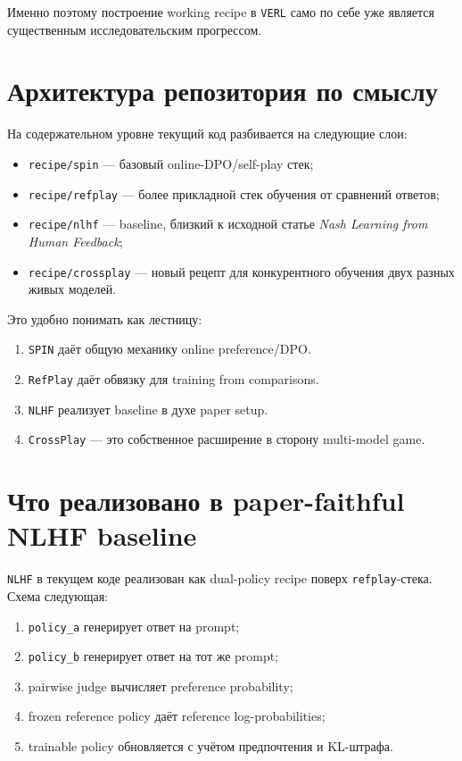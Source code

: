 \documentclass[11pt,a4paper]{article}
\begin{document}
Именно поэтому построение working recipe в \texttt{VERL} само по себе уже является существенным исследовательским прогрессом.

\section{Архитектура репозитория по смыслу}

На содержательном уровне текущий код разбивается на следующие слои:
\begin{itemize}
  \item \texttt{recipe/spin} --- базовый online-DPO/self-play стек;
  \item \texttt{recipe/refplay} --- более прикладной стек обучения от сравнений ответов;
  \item \texttt{recipe/nlhf} --- baseline, близкий к исходной статье \textit{Nash Learning from Human Feedback};
  \item \texttt{recipe/crossplay} --- новый рецепт для конкурентного обучения двух разных живых моделей.
\end{itemize}

Это удобно понимать как лестницу:
\begin{enumerate}[label=\arabic*.]
  \item \texttt{SPIN} даёт общую механику online preference/DPO.
  \item \texttt{RefPlay} даёт обвязку для training from comparisons.
  \item \texttt{NLHF} реализует baseline в духе paper setup.
  \item \texttt{CrossPlay} --- это собственное расширение в сторону multi-model game.
\end{enumerate}

\section{Что реализовано в paper-faithful NLHF baseline}

\texttt{NLHF} в текущем коде реализован как dual-policy recipe поверх \texttt{refplay}-стека. Схема следующая:
\begin{enumerate}[label=\arabic*.]
  \item \texttt{policy\_a} генерирует ответ на prompt;
  \item \texttt{policy\_b} генерирует ответ на тот же prompt;
  \item pairwise judge вычисляет preference probability;
  \item frozen reference policy даёт reference log-probabilities;
  \item trainable policy обновляется с учётом предпочтения и KL-штрафа.
\end{enumerate}
\end{document}
